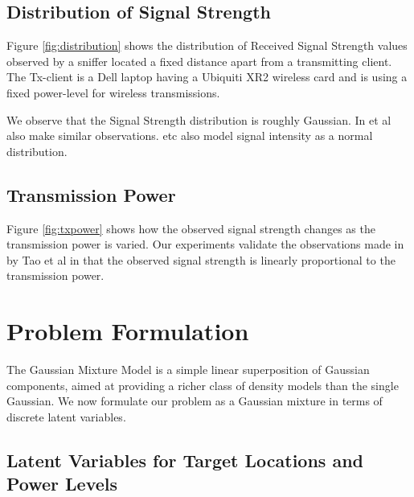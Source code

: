 \documentclass{Localization-PaperWriteupDraft}
\begin{document}
\subsection{Distribution of Signal Strength}
\label{subsec:distributionofsignalstrength}

Figure \ref{fig:distribution} shows the distribution of Received Signal
Strength values observed by a sniffer located a fixed distance apart
from a transmitting client. The Tx-client is a Dell laptop having a
Ubiquiti XR2 wireless card and is using a fixed power-level for wireless
transmissions. 

We observe that the Signal Strength distribution is roughly Gaussian. In
\cite{Tao:2003:WLL:941311.941314} et al also make similar observations.
\cite{Haeberlen:2004:PRL:1023720.1023728} \cite{Moraes:2006:CWL:1164783.1164799} etc also model signal intensity
as a normal distribution.

\subsection{Transmission Power}
\label{subsec:transmissionpower}

Figure \ref{fig:txpower} shows how the observed signal strength changes
as the transmission power is varied. Our experiments validate the
observations made in \cite{Tao:2003:WLL:941311.941314} by Tao et al in that the observed
signal strength is linearly proportional to the transmission power.

\section{Problem Formulation}
\label{sec:problemformulation}

The Gaussian Mixture Model is a simple linear superposition of Gaussian components, aimed at providing a richer class of density models than the single Gaussian. We now formulate our problem as a Gaussian mixture in terms of discrete latent variables. 


\subsection{Latent Variables for Target Locations and Power Levels}
\label{subsec:latentvariablesfortargetlocationsandpowerlevels}
\end{document}
